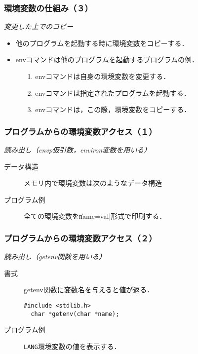 \documentclass{beamer}                 %
\begin{document}
\begin{frame}[fragile]
  \frametitle{環境変数の仕組み（３）}
  \emph{変更した上でのコピー}
  \begin{itemize}
  \item 他のプログラムを起動する時に環境変数をコピーする．
  \item envコマンドは他のプログラムを起動するプログラムの例．
    \begin{enumerate}
    \item[1.] envコマンドは自身の環境変数を変更する．
    \item[2.] envコマンドは指定されたプログラムを起動する．
    \item[3.] envコマンドは，この際，環境変数をコピーする．
    \end{enumerate}
  \end{itemize}
\end{frame}

\begin{frame}[fragile]
  \frametitle{プログラムからの環境変数アクセス（１）}
  \emph{読み出し（envp仮引数，environ変数を用いる）}
  \begin{description}
  \item[データ構造] メモリ内で環境変数は次のようなデータ構造
  \item[プログラム例] 全ての環境変数を\|name=val|形式で印刷する．
  \end{description}
\end{frame}

\begin{frame}[fragile]
  \frametitle{プログラムからの環境変数アクセス（２）}
  \emph{読み出し（getenv関数を用いる）}
  \begin{description}
  \item [書式] getenv関数に変数名を与えると値が返る．
\begin{lstlisting}[numbers=none]
  #include <stdlib.h>
  char *getenv(char *name);
\end{lstlisting}
  \item [プログラム例] \texttt{LANG}環境変数の値を表示する．
  \end{description}
\end{frame}
\end{document}
